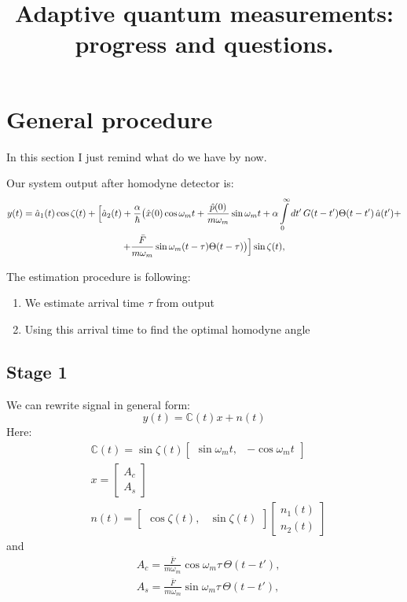 \documentclass[notitlepage,a4paper,11pt,hyperref=pdftex]{revtex4-1}
\begin{document}
\title{Adaptive quantum measurements: progress and questions.}
\maketitle
\section{General procedure}
In this section I just remind what do we have by now.

Our system output  after homodyne detector is: 
\begin{multline}\label{init_y}
 y(t)=\hat{a}_1(t)\cos \zeta(t)+\Bigl[\hat{a}_2(t)+\frac{\alpha}{\hbar}\bigl(\hat{x}(0) \cos \omega_m t+ \frac{\hat{p}(0)}{m \omega_m} \sin \omega_m t + \alpha \int\limits_0^{\infty} dt' \, G(t-t') \Theta(t-t')\, \hat{a}(t') +\\+ \frac{\bar{F}}{m\omega_m}\sin\omega_m(t-\tau)\Theta(t-\tau)\bigr)\Bigr]\sin\zeta(t),
\end{multline}

The estimation procedure is following:
\begin{enumerate}
 \item We estimate arrival time $\tau$ from output
 \item Using this arrival time to find the optimal homodyne angle
\end{enumerate}

\subsection{Stage 1}
We can rewrite signal in general form:
\begin{equation}
 y(t)=\mathbb{C}(t)x+n(t)
\end{equation}
Here:
\begin{align}
& \mathbb{C}(t) = \sin\zeta(t)
\begin{bmatrix}
 \sin\omega_mt, & -\cos\omega_mt
\end{bmatrix}
\\
&
x=
\begin{bmatrix}
 A_c\\
A_s
\end{bmatrix}
\\
& n(t) = 
\begin{bmatrix}
 \cos\zeta(t), & \sin\zeta(t)
\end{bmatrix}
\begin{bmatrix}
 n_1(t)\\
n_2(t)
\end{bmatrix}
\end{align}
and 
\begin{align}
 & A_c = \frac{\bar{F}}{m\omega_m}\cos\omega_m\tau\,\Theta(t-t'),\\
& A_s = \frac{\bar{F}}{m\omega_m}\sin\omega_m\tau\,\Theta(t-t'),
\end{align}
\end{document}
